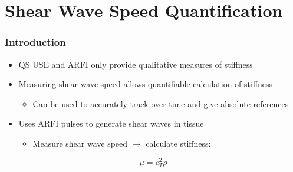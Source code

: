 \documentclass{beamer}
\begin{document}
	\section[Shear]{Shear Wave Speed Quantification}
		\begin{frame}
			\frametitle{Introduction}
			\begin{itemize}
				\item QS USE and ARFI only provide \alert{qualitative} measures of stiffness
				\item Measuring shear wave speed allows quantifiable calculation of stiffness
				\begin{itemize}
					\item Can be used to accurately track over time and give absolute references
				\end{itemize}
				\item Uses ARFI pulses to generate shear waves in tissue
				\begin{itemize}
					\item Measure shear wave speed $\rightarrow$ calculate stiffness:
				\end{itemize}
			\end{itemize}
			\begin{equation*}
				\mu = c_T^2 \rho
			\end{equation*}
		\end{frame}
\end{document}
